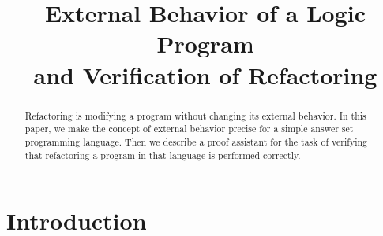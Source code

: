 \documentclass{tlp}
\begin{document}

\title[External Behavior and Verification of Refactoring]{\bf External Behavior of a Logic Program\\
  and Verification of Refactoring}

  \begin{authgrp}
\author{}
\author{}
\end{authgrp}
\jnlPage{\pageref{firstpage}}{\pageref{lastpage}}

\maketitle

\label{firstpage}



\maketitle


\begin{abstract}
  Refactoring is modifying a program without changing its external behavior.
  In this paper, we
  make the concept of external behavior precise for a simple answer set
  programming language.  Then we describe a proof assistant for the
  task of verifying
  that refactoring a program in that language is performed correctly.
\end{abstract}
  
\section{Introduction}
\end{document}
